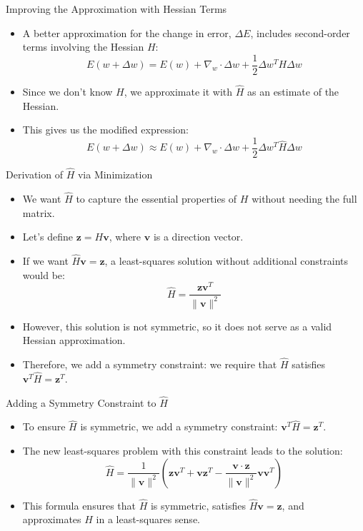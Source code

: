 \documentclass{beamer}
\begin{document}
\begin{frame}{Improving the Approximation with Hessian Terms}
    \begin{itemize}
        \item A better approximation for the change in error, \(\Delta E\), includes second-order terms involving the Hessian \(H\):
        \[
        E(w + \Delta w) = E(w) + \nabla_w \cdot \Delta w + \frac{1}{2} \Delta w^T H \Delta w
        \]
        \item Since we don’t know \(H\), we approximate it with \(\hat{H}\) as an estimate of the Hessian.
        \item This gives us the modified expression:
        \[
        E(w + \Delta w) \approx E(w) + \nabla_w \cdot \Delta w + \frac{1}{2} \Delta w^T \hat{H} \Delta w
        \]
    \end{itemize}
\end{frame}


\begin{frame}{Derivation of \(\hat{H}\) via Minimization}
    \begin{itemize}
        \item We want \(\hat{H}\) to capture the essential properties of \(H\) without needing the full matrix.
        \item Let’s define \(\mathbf{z} = H \mathbf{v}\), where \(\mathbf{v}\) is a direction vector.
       \item If we want \(\hat{H} \mathbf{v} = \mathbf{z}\), a least-squares solution without additional constraints would be:
        \[
        \hat{H} = \frac{\mathbf{z} \mathbf{v}^T}{\| \mathbf{v} \|^2}
        \]
        \item However, this solution is not symmetric, so it does not serve as a valid Hessian approximation.
        \item Therefore, we add a symmetry constraint: we require that \(\hat{H}\) satisfies \(\mathbf{v}^T \hat{H} = \mathbf{z}^T\).
    \end{itemize}
\end{frame}

\begin{frame}{Adding a Symmetry Constraint to \(\hat{H}\)}
    \begin{itemize}
        \item To ensure \(\hat{H}\) is symmetric, we add a symmetry constraint: \(\mathbf{v}^T \hat{H} = \mathbf{z}^T\).
        \item The new least-squares problem with this constraint leads to the solution:
        \[
        \hat{H} = \frac{1}{\| \mathbf{v} \|^2} \left( \mathbf{z} \mathbf{v}^T + \mathbf{v} \mathbf{z}^T - \frac{\mathbf{v} \cdot \mathbf{z}}{\| \mathbf{v} \|^2} \mathbf{v} \mathbf{v}^T \right)
        \]
        \item This formula ensures that \(\hat{H}\) is symmetric, satisfies \(\hat{H} \mathbf{v} = \mathbf{z}\), and approximates \(H\) in a least-squares sense.
    \end{itemize}
\end{frame}
\end{document}
